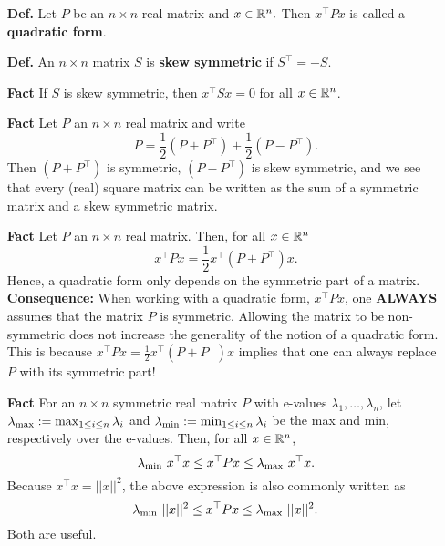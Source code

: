 \begin{tcolorbox}[title= \textbf{Some Definitions and Facts}]

\begin{enumerate}
    \item[{\bf Def.}]  Let $P$ be an $n \times n$ real matrix and $x \in \mathbb R^n.$ Then $x^\top Px$ is called a \textbf{quadratic form}.
    
    \item[{\bf Def.}] An $n \times n$ matrix $S$ is \textbf{skew symmetric} if $S^\top=-S$.
    
    \item[{\bf Fact}]  If $S$ is skew symmetric, then $x^\top S x=0$ for all $x \in \mathbb R^n$.
    
    \item[{\bf Fact}] Let $P$ an $n \times n$ real matrix and write
    $$P = \frac{1}{2} \left(P + P^\top   \right) + \frac{1}{2} \left(P - P^\top   \right).$$
    Then $\left(P + P^\top   \right)$ is symmetric, $ \left(P - P^\top   \right)$ is skew symmetric, and we see that every (real) square matrix can be written as the sum of a symmetric matrix and a skew symmetric matrix. 
  
      \item[{\bf Fact}] Let $P$ an $n \times n$ real matrix. Then, for all $x\in \mathbb R^n$
      $$x^\top Px=  \frac{1}{2}  x^\top \left(P + P^\top   \right)x.$$
      Hence, a quadratic form only depends on the symmetric part of a matrix. \\
      
      \textbf{Consequence:} When working with a quadratic form, $x^\top P x$, one \textbf{ALWAYS} assumes that the matrix $P$ is symmetric. Allowing the matrix to be non-symmetric does not increase the generality of the notion of a quadratic form. This is because $x^\top Px=  \frac{1}{2}  x^\top \left(P + P^\top   \right)x$ implies that one can always replace $P$ with its symmetric part!
      
      \item[{\bf Fact}] For an $n \times n$ symmetric real matrix $P$ with e-values $\lambda_1, \ldots, \lambda_n$, let $\lambda_{\rm max}:= \max_{1 \le i \le n} \lambda_i$ and $\lambda_{\rm min}:= \min_{1 \le i \le n} \lambda_i$ be the max and min, respectively over the e-values. Then, for all $x\in \mathbb R^n$,
      \begin{equation}
          \label{eq:SymmetricBoundsEvalues}
          \lambda_{\rm min}~ x^\top x \le x^\top P x \le \lambda_{\rm max}~ x^\top x.
      \end{equation}
      Because $x^\top x = ||x||^2$, the above expression is also commonly written as
      $$  \lambda_{\rm min}~ ||x||^2 \le x^\top P x \le \lambda_{\rm max}~ ||x||^2.$$
      Both are useful.
\end{enumerate}
\end{tcolorbox}

